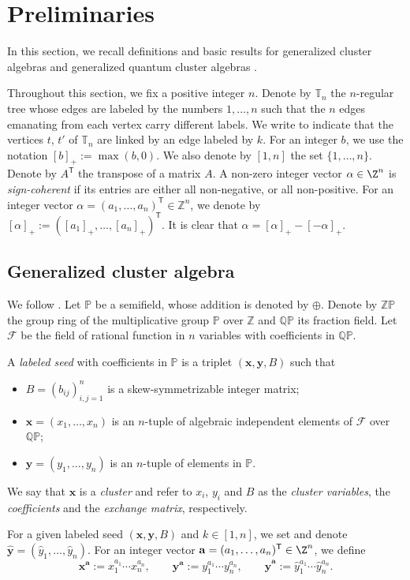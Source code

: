 \section{Preliminaries}\label{Preliminaries}
 In this section, we recall definitions and basic results for generalized cluster algebras \cite{Chekhov_Shapiro} and generalized quantum cluster algebras \cite{BCDX2018}.

 Throughout this section, we fix a positive integer $n$. Denote by $\mathbb{T}_n$ the $n$-regular tree whose edges are labeled by the numbers $1,\dots,n$ such that the $n$ edges emanating from each vertex carry different labels. We write
  to indicate that the vertices $t$, $t'$ of $\mathbb{T}_n$ are linked by an edge labeled by $k$.
For an integer $b$, we use the notation $[b]_+:=\max(b,0)$. We also denote by $[1,n]$ the set $\{1,\dots,n\}$. Denote by $A^{\mathsf T}$ the transpose of a matrix $A$. A non-zero integer vector $\alpha\in \Z^n$ is {\it sign-coherent} if its entries are either all non-negative, or all non-positive.
For an integer vector $\alpha=(a_1,\dots,a_n)^{\mathsf T}\in\mathbb{Z}^n$, we denote by $[\alpha]_+:=([a_1]_+,\dots,[a_n]_+)^{\mathsf T}$. It is clear that $\alpha=[\alpha]_+-[-\alpha]_+$.

\subsection{Generalized cluster algebra}\label{S2}
 We follow \cite{Nakanishi14}.
Let $\mathbb{P}$ be a semifield, whose addition is denoted by $\oplus$. Denote by $\mathbb{ZP}$ the group ring of the multiplicative group $\mathbb{P}$ over $\mathbb{Z}$ and $\mathbb{QP}$ its fraction field. Let
$\mathcal{F}$ be the field of rational function in $n$ variables with coefficients in $\mathbb{QP}$.

\begin{Definition}\label{D4}
 A {\it labeled seed} with coefficients in $\mathbb{P}$ is a triplet $(\mathbf{x},\mathbf{y},B)$ such that
 \begin{itemize}\itemsep=0pt
 \item $B=(b_{ij})_{i,j=1}^{n}$ is a skew-symmetrizable integer matrix;
 \item $\mathbf{x}=(x_1,\dots,x_n)$ is an $n$-tuple of algebraic independent elements of $\mathcal{F}$ over $\mathbb{QP}$;
 \item $\mathbf{y}=(y_1,\dots,y_n)$ is an $n$-tuple of elements in $\mathbb{P}$.

 \end{itemize}
We say that $\mathbf{x}$ is a {\it cluster} and refer to $x_i$, $y_i$ and $B$ as the {\it cluster variables}, the {\it coefficients}
and the {\it exchange matrix}, respectively.
\end{Definition}
For a given labeled seed $(\mathbf{x},\mathbf{y},B)$ and $k\in [1,n]$, we set
and denote ${\hat{\mathbf{y}}=(\hat{y}_1,\dots, \hat{y}_n)}$. For an integer vector $\mathbf{a}=(a_1,\dots, a_n)^{\mathsf T}\in \Z^n$, we define
\[
\mathbf{x}^\mathbf{a}:=x_1^{a_1}\cdots x_n^{a_n},\qquad \mathbf{y}^\mathbf{a}:=y_1^{a_1}\cdots y_n^{a_n},\qquad \hat{\mathbf{y}}^\mathbf{a}:=\hat{y}_1^{a_1}\cdots \hat{y}_n^{a_n}.
\]


